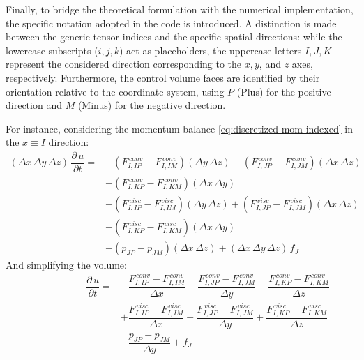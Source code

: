\documentclass[12pt, a4paper, twoside, openright]{book}
\begin{document}
Finally, to bridge the theoretical formulation with the numerical implementation, the specific notation adopted in the code is introduced. A distinction is made between the generic tensor indices and the specific spatial directions: while the lowercase subscripts ($i, j, k$) act as placeholders, the uppercase letters $I, J, K$ represent the considered direction corresponding to the $x, y$, and $z$ axes, respectively. Furthermore, the control volume faces are identified by their orientation relative to the coordinate system, using $P$ (Plus) for the positive direction and $M$ (Minus) for the negative direction.

For instance, considering the momentum balance \eqref{eq:discretized-mom-indexed} in the $x \equiv I$ direction:
\begin{equation}
	\begin{split}
		(\Delta x \, \Delta y \, \Delta z) \, \dfrac{\partial \, u}{\partial t} =
		&- (F_{I, IP}^{\, conv} - F_{I, IM}^{\, conv})(\Delta y \, \Delta z)
			-  (F_{I, JP}^{\, conv} - F_{I, JM}^{\, conv})(\Delta x \, \Delta z)\\
			&-  (F_{I, KP}^{\, conv} - F_{I, KM}^{\, conv})(\Delta x \, \Delta y)\\
		&+ (F_{I, IP}^{\, visc} - F_{I, IM}^{\, visc})(\Delta y \, \Delta z)
			+  (F_{I, JP}^{\, visc} - F_{I, JM}^{\, visc})(\Delta x \, \Delta z)\\
			&+  (F_{I, KP}^{\, visc} - F_{I, KM}^{\, visc})(\Delta x \, \Delta y)\\
		&- (p_{JP} - p_{JM})(\Delta x \, \Delta z) + (\Delta x \, \Delta y \, \Delta z) \, f_J 
	\end{split}
\end{equation}
And simplifying the volume:
\begin{equation}
    \begin{split}
		\phantom{(\Delta x \, \Delta y \, ,)}\,
        \dfrac{\partial \, u}{\partial t} =
        &- \dfrac{F_{I, IP}^{\, conv} - F_{I, IM}^{\, conv}}{\Delta x}
         - \dfrac{F_{I, JP}^{\, conv} - F_{I, JM}^{\, conv}}{\Delta y}
         - \dfrac{F_{I, KP}^{\, conv} - F_{I, KM}^{\, conv}}{\Delta z} \\[1em]
        &+ \dfrac{F_{I, IP}^{\, visc} - F_{I, IM}^{\, visc}}{\Delta x}
         + \dfrac{F_{I, JP}^{\, visc} - F_{I, JM}^{\, visc}}{\Delta y}
         + \dfrac{F_{I, KP}^{\, visc} - F_{I, KM}^{\, visc}}{\Delta z} \\[1em]
        &- \dfrac{p_{JP} - p_{JM}}{\Delta y} + f_J 
    \end{split}
	\label{eq:discretized-mom-faces}
\end{equation}
\end{document}
